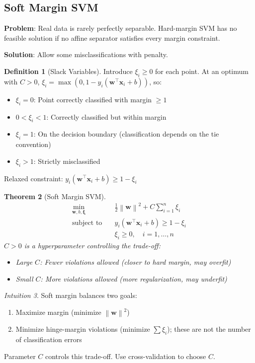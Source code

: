 \documentclass[11pt,twoside]{article}
\numberwithin{equation}{section}
\newcommand{\vect}[1]{\bm{#1}}
\newcommand{\norm}[1]{\left\lVert#1\right\rVert}
\theoremstyle{plain}
\newtheorem{theorem}{Theorem}[section]
\theoremstyle{definition}
\newtheorem{definition}[theorem]{Definition}
\theoremstyle{remark}
\newtheorem{intuition}[theorem]{Intuition}
\begin{document}
\subsection{Soft Margin SVM}

\textbf{Problem}: Real data is rarely perfectly separable. Hard-margin SVM has no feasible solution if no affine separator satisfies every margin constraint.

\textbf{Solution}: Allow some misclassifications with penalty.

\begin{definition}[Slack Variables]
Introduce $\xi_i\geq0$ for each point. At an optimum with $C>0$, $\xi_i=\max(0,1-y_i(\vect{w}^\top\vect{x}_i+b))$, so:
\begin{itemize}
\item $\xi_i = 0$: Point correctly classified with margin $\geq 1$
\item $0 < \xi_i < 1$: Correctly classified but within margin
\item $\xi_i=1$: On the decision boundary (classification depends on the tie convention)
\item $\xi_i>1$: Strictly misclassified
\end{itemize}
Relaxed constraint: $y_i(\vect{w}^\top\vect{x}_i + b) \geq 1 - \xi_i$
\end{definition}

\begin{theorem}[Soft Margin SVM]
\[
\begin{aligned}
\min_{\vect{w}, b, \vect{\xi}} \quad & \frac{1}{2}\norm{\vect{w}}^2 + C\sum_{i=1}^n \xi_i \\
\text{subject to} \quad & y_i(\vect{w}^\top\vect{x}_i + b) \geq 1 - \xi_i \\
& \xi_i \geq 0, \quad i = 1, \ldots, n
\end{aligned}
\]
$C > 0$ is a hyperparameter controlling the trade-off:
\begin{itemize}
\item Large $C$: Fewer violations allowed (closer to hard margin, may overfit)
\item Small $C$: More violations allowed (more regularization, may underfit)
\end{itemize}
\end{theorem}

\begin{intuition}
Soft margin balances two goals:
\begin{enumerate}
\item Maximize margin (minimize $\norm{\vect{w}}^2$)
\item Minimize hinge-margin violations (minimize $\sum \xi_i$); these are not the number of classification errors
\end{enumerate}
Parameter $C$ controls this trade-off. Use cross-validation to choose $C$.
\end{intuition}
\end{document}
